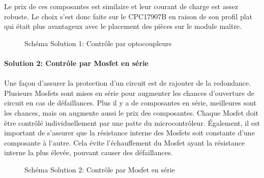 		Le prix de ces composantes est similaire et leur courant de charge est assez robuste. Le choix s'est donc faite sur le CPC17907B en raison de son profil plat qui était plus avantageux avec le placement des pièces sur le module maître.
		
		\begin{figure}[H]
			\centering
			\caption[]{Schéma Solution 1: Contrôle par optocoupleurs}
			\label{fig:contactorsol1}
		\end{figure}
		
		
		\paragraph*{Solution 2: Contrôle par Mosfet en série}
		\paragraph*{}
		Une façon d'assurer la protection d'un circuit est de rajouter de la redondance. Plusieurs Mosfets sont mises en série pour augmenter les chances d'ouverture de circuit en cas de défaillances. Plus il y a de composantes en série, meilleures sont les chances, mais on augmente aussi le prix des composantes. Chaque Mosfet doit être contrôlé individuellement par une patte du microcontrôleur. Également, il est important de s'assurer que la résistance interne des Mosfets soit constante d'une composante à l'autre. Cela évite l'échauffement du Mosfet ayant la résistance interne la plus élevée, pouvant causer des défaillances.
		
		\begin{figure}[H]
			\centering
			\caption{Schéma Solution 2: Contrôle par Mosfet en série}
			\label{fig:contactorsol2}
		\end{figure}
		

